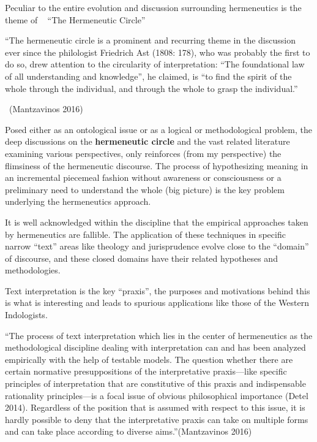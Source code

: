 \smallskip

Peculiar to the entire evolution and discussion surrounding hermeneutics is the theme of   “The Hermeneutic Circle” 

\smallskip

\begin{myquote}
“The hermeneutic circle is a prominent and recurring theme in the discussion ever since the philologist Friedrich Ast (1808: 178), who was probably the first to do so, drew attention to the circularity of interpretation: “The foundational law of all understanding and knowledge”, he claimed, is “to find the spirit of the whole through the individual, and through the whole to grasp the individual.”

~\hfill (Mantzavinos 2016)
\end{myquote}

\smallskip

Posed either as an ontological issue or as a logical or methodological problem, the deep discussions on the \textbf{hermeneutic circle} and the vast related literature examining various perspectives, only reinforces (from my perspective) the flimsiness of the hermeneutic discourse. The process of hypothesizing meaning in an incremental piecemeal fashion without awareness or consciousness or a preliminary need to understand the whole (big picture) is the key problem underlying the hermeneutics approach.

It is well acknowledged within the discipline that the empirical approaches taken by hermeneutics are fallible. The application of these techniques in specific narrow “text” areas like theology and jurisprudence evolve close to the “domain” of discourse, and these closed domains have their related hypotheses and methodologies.

Text interpretation is the key “praxis”, the purposes and motivations behind this is what is interesting and leads to spurious applications like those of the Western Indologists. 

\medskip

\begin{myquote}
“The process of text interpretation which lies in the center of hermeneutics as the methodological discipline dealing with interpretation can and has been analyzed empirically with the help of testable models. The question whether there are certain normative presuppositions of the interpretative praxis—like specific principles of interpretation that are constitutive of this praxis and indispensable rationality principles—is a focal issue of obvious philosophical importance (Detel 2014). Regardless of the position that is assumed with respect to this issue, it is hardly possible to deny that the interpretative praxis can take on multiple forms and can take place according to diverse aims.”\hfill (Mantzavinos 2016)
\end{myquote}

